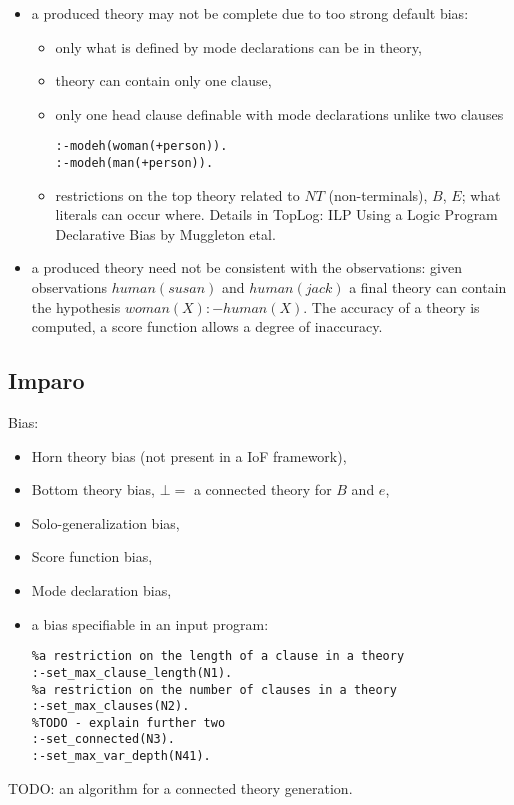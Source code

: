 \begin{itemize}
\item a produced theory may not be complete due to too strong default bias:
\begin{itemize}
\item only what is defined by mode declarations can be in theory,
\item theory can contain only one clause,
\item only one head clause definable with mode declarations unlike two clauses
\begin{lstlisting}
:-modeh(woman(+person)).
:-modeh(man(+person)).
\end{lstlisting}

\item restrictions on the top theory related to $NT$ (non-terminals), $B$, $E$; what literals can occur where. Details in TopLog: ILP Using a Logic Program Declarative Bias by Muggleton etal.
\end{itemize}
\item a produced theory need not be consistent with the observations: given observations $human(susan)$ and $human(jack)$ a final theory can contain the hypothesis $woman(X) :- human(X)$. The accuracy of a theory is computed, a score function allows a degree of inaccuracy.
\end{itemize}

\iffalse
\subsection{ProGolem}
\begin{itemize}
\item Inverse Entailment,
\item co-generalization, 
\end{itemize}
\fi

\subsection{Imparo\cite{kimber2009induction}}
Bias:
\begin{itemize}
\item Horn theory bias (not present in a IoF framework),
\item Bottom theory bias, $\bot=$ a connected theory for $B$ and $e$,
\item Solo-generalization bias,
\item Score function bias,
\item Mode declaration bias,
\item a bias specifiable in an input program:
\begin{lstlisting}
%a restriction on the length of a clause in a theory
:-set_max_clause_length(N1).
%a restriction on the number of clauses in a theory
:-set_max_clauses(N2).
%TODO - explain further two
:-set_connected(N3).
:-set_max_var_depth(N41).
\end{lstlisting}
\end{itemize}
TODO: an algorithm for a connected theory generation.

